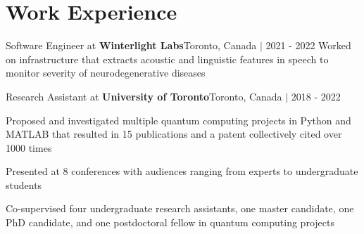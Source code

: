 


\section{Work Experience}

\begin{jobshort}{Software Engineer at \textbf{Winterlight Labs}}{Toronto, Canada $\vert$ 2021 - 2022}
Worked on infrastructure that extracts acoustic and linguistic features in speech to monitor severity of neurodegenerative diseases
\end{jobshort}


\begin{joblong}{Research Assistant at \textbf{University of Toronto}}{Toronto, Canada $\vert$ 2018 - 2022}
  \item Proposed and investigated multiple quantum computing projects in Python and MATLAB that resulted in 15 publications and a patent collectively cited over 1000 times
  \item Presented at 8 conferences with audiences ranging from experts to undergraduate students\
  \item Co-supervised four undergraduate research assistants, one master candidate, one PhD candidate, and one postdoctoral fellow in quantum computing projects
\end{joblong}



